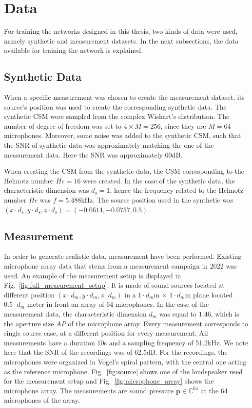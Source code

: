 \documentclass[11pt,a4paper,twoside]{report}
\begin{document}
\section{Data}

For training the networks designed in this thesis, two kinds of data were used, namely synthetic and measurement datasets. In the next subsections, the data available for training the network is explained. 

\subsection{Synthetic Data}

When a specific measurement was chosen to create the measurement dataset, its source's position was used to create the corresponding synthetic data. The synthetic CSM were sampled from the complex Wishart's distribution. The number of degree of freedom was set to $4 \times M = 256$, since they are $M = 64$ microphones. Moreover, some noise was added to the synthetic CSM, such that the SNR of synthetic data was approximately matching the one of the measurement data. Here the SNR was approximately 60dB. 

When creating the CSM from the synthetic data, the CSM corresponding to the Helmotz number $He = 16$ were created. In the case of the synthetic data, the characteristic dimension was $d_s = 1$, hence the frequency related to the Helmotz number $He$ was $f = 5.488$kHz. The source position used in the synthetic was $(x \cdot d_s,y \cdot d_s, z \cdot d_s) = (-0.0614,-0.0757, 0.5)$.

\subsection{Measurement}

In order to generate realistic data, measurement have been performed. Existing microphone array data that stems from a measurement campaign in 2022 was used. An example of the measurement setup is displayed in Fig.~\ref{fig:full_measurement_setup}. It is made of sound sources located at different position $(x \cdot d_m,y \cdot d_m, z \cdot d_m)$ in a $1 \cdot d_m$m $\times$ $1 \cdot d_m$m plane located $0.5 \cdot d_m$ meter in front an array of 64 microphones. In the case of the measurement data, the characteristic dimension $d_m$ was equal to $1.46$, which is the aperture size $AP$ of the microphone array. Every measurement corresponds to single source case, at a different position for every measurement. All measurements have a duration 10s and a sampling frequency of 51.2kHz. We note here that the SNR of the recordings was of 62.5dB. For the recordings, the microphones were organized in Vogel's spiral pattern, with the central one acting as the reference microphone.  Fig.~\ref{fig:source} shows one of the loudspeaker used for the measurement setup and Fig.~\ref{fig:microphone_array} shows the microphone array. The measurements are sound pressure $\mathbf{p} \in \mathbb{C}^{64}$ at the 64 microphones of the array.
\end{document}
